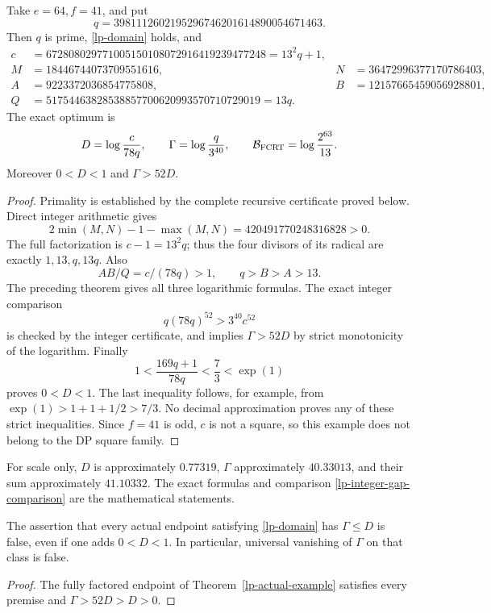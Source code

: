 \begin{theorem}
\label{lp-actual-example}
Take \(e=64,f=41\), and put
\[
 q=3981112602195296746201614890054671463.
\]
Then \(q\) is prime, \eqref{lp-domain} holds, and
\begin{align*}
 c&=672808029771005150108072916419239477248=13^2q+1,\\
 M&=18446744073709551616,
       &N&=36472996377170786403,\\
 A&=9223372036854775808,
       &B&=12157665459056928801,\\
 Q&=51754463828538857700620993570710729019=13q.
\end{align*}
The exact optimum is
\[
 D=\log\frac{c}{78q},\qquad
 \Gamma=\log\frac q{3^{40}},\qquad
 \mathcal B_{\rm FCRT}=\log\frac{2^{63}}{13}.
\]
Moreover \(0<D<1\) and \(\Gamma>52D\).
\end{theorem}
\begin{proof}
Primality is established by the complete recursive certificate proved
below. Direct integer arithmetic gives
\[
 2\min(M,N)-1-\max(M,N)=420491770248316828>0.
\]
The full factorization is \(c-1=13^2q\); thus the four divisors of its
radical are exactly \(1,13,q,13q\). Also
\[
 AB/Q=c/(78q)>1,\qquad q>B>A>13.
\]
The preceding theorem gives all three logarithmic formulas. The exact
integer comparison
\begin{equation}\label{lp-integer-gap-comparison}
 q(78q)^{52}>3^{40}c^{52}
\end{equation}
is checked by the integer certificate, and implies \(\Gamma>52D\)
by strict monotonicity of the logarithm. Finally
\[
 1<\frac{169q+1}{78q}<\frac73<\exp(1)
\]
proves \(0<D<1\). The last inequality follows, for example, from
\(\exp(1)>1+1+1/2>7/3\). No decimal approximation proves any of these
strict inequalities. Since \(f=41\) is odd, \(c\) is not a square,
so this example does not belong to the DP square family.
\end{proof}

For scale only, \(D\) is approximately \(0.77319\), \(\Gamma\)
approximately \(40.33013\), and their sum approximately \(41.10332\).
The exact formulas and comparison \eqref{lp-integer-gap-comparison}
are the mathematical statements.

\begin{corollary}
\label{lp-scalar-control-fails}
The assertion that every actual endpoint satisfying
\eqref{lp-domain} has \(\Gamma\le D\) is false, even if one adds
\(0<D<1\). In particular, universal vanishing of \(\Gamma\) on that
class is false.
\end{corollary}
\begin{proof}
The fully factored endpoint of Theorem~\ref{lp-actual-example}
satisfies every premise and \(\Gamma>52D>D>0\).
\end{proof}

